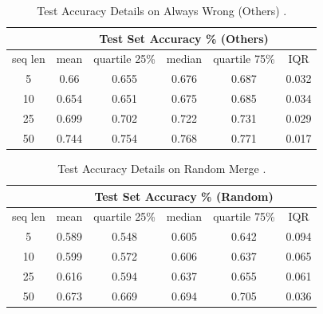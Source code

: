 \documentclass[12pt]{article}
\begin{document}
\begin{table}[!h]
\begin{tabular}{c|ccccc|}
\cline{2-6}
\multicolumn{1}{l|}{}         & \multicolumn{5}{c|}{Test Set Accuracy \% (Others)}                                                                                         \\ \hline
\multicolumn{1}{|c|}{seq len} & \multicolumn{1}{c|}{mean}  & \multicolumn{1}{c|}{quartile 25\%} & \multicolumn{1}{c|}{median} & \multicolumn{1}{c|}{quartile 75\%} & IQR   \\ \hline
\multicolumn{1}{|c|}{5}       & \multicolumn{1}{c|}{0.66}  & \multicolumn{1}{c|}{0.655}         & \multicolumn{1}{c|}{0.676}  & \multicolumn{1}{c|}{0.687}         & 0.032 \\ \hline
\multicolumn{1}{|c|}{10}      & \multicolumn{1}{c|}{0.654} & \multicolumn{1}{c|}{0.651}         & \multicolumn{1}{c|}{0.675}  & \multicolumn{1}{c|}{0.685}         & 0.034 \\ \hline
\multicolumn{1}{|c|}{25}      & \multicolumn{1}{c|}{0.699} & \multicolumn{1}{c|}{0.702}         & \multicolumn{1}{c|}{0.722}  & \multicolumn{1}{c|}{0.731}         & 0.029 \\ \hline
\multicolumn{1}{|c|}{50}      & \multicolumn{1}{c|}{0.744} & \multicolumn{1}{c|}{0.754}         & \multicolumn{1}{c|}{0.768}  & \multicolumn{1}{c|}{0.771}         & 0.017 \\ \hline
\end{tabular}
\caption{Test Accuracy Details on Always Wrong (Others) .}
\label{appendix:alwayswrongOthers}
\end{table}


\begin{table}[!h]
\begin{tabular}{c|ccccc|}
\cline{2-6}
\multicolumn{1}{l|}{}         & \multicolumn{5}{c|}{Test Set Accuracy \% (Random)}                                                                                         \\ \hline
\multicolumn{1}{|c|}{seq len} & \multicolumn{1}{c|}{mean}  & \multicolumn{1}{c|}{quartile 25\%} & \multicolumn{1}{c|}{median} & \multicolumn{1}{c|}{quartile 75\%} & IQR   \\ \hline
\multicolumn{1}{|c|}{5}       & \multicolumn{1}{c|}{0.589} & \multicolumn{1}{c|}{0.548}         & \multicolumn{1}{c|}{0.605}  & \multicolumn{1}{c|}{0.642}         & 0.094 \\ \hline
\multicolumn{1}{|c|}{10}      & \multicolumn{1}{c|}{0.599} & \multicolumn{1}{c|}{0.572}         & \multicolumn{1}{c|}{0.606}  & \multicolumn{1}{c|}{0.637}         & 0.065 \\ \hline
\multicolumn{1}{|c|}{25}      & \multicolumn{1}{c|}{0.616} & \multicolumn{1}{c|}{0.594}         & \multicolumn{1}{c|}{0.637}  & \multicolumn{1}{c|}{0.655}         & 0.061 \\ \hline
\multicolumn{1}{|c|}{50}      & \multicolumn{1}{c|}{0.673} & \multicolumn{1}{c|}{0.669}         & \multicolumn{1}{c|}{0.694}  & \multicolumn{1}{c|}{0.705}         & 0.036 \\ \hline
\end{tabular}
\caption{Test Accuracy Details on Random Merge .}
\label{appendix:randMerge}
\end{table}
\end{document}
